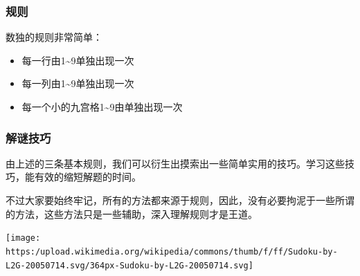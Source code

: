 \documentclass[xcolor=table]{beamer}
\begin{document}
\begin{mdframe}%

\frametitle{规则}\label{heading-section}%

\noindent{}数独的规则非常简单：%

\begin{itemize}[noitemsep,topsep=\mdcompacttopsep]%

\item{}每一行由1\textasciitilde{}9单独出现一次%

\item{}每一列由1\textasciitilde{}9单独出现一次%

\item{}每一个小的九宫格1\textasciitilde{}9由单独出现一次%
\end{itemize}%
\end{mdframe}\label{section}%

\begin{mdframe}%

\frametitle{解谜技巧}\label{heading-section}%

\noindent{}由上述的三条基本规则，我们可以衍生出摸索出一些简单实用的技巧。学习这些技巧，能有效的缩短解题的时间。%

不过大家要始终牢记，所有的方法都来源于规则，因此，没有必要拘泥于一些所谓的方法，这些方法只是一些辅助，深入理解规则才是王道。%

\begin{mdcenter}%

\noindent{}\texttt{[image: https:/upload.wikimedia.org/wikipedia/commons/thumb/f/ff/Sudoku-by-L2G-20050714.svg/364px-Sudoku-by-L2G-20050714.svg]}{}%
\end{mdcenter}%
\end{mdframe}\label{section}%
\end{document}
